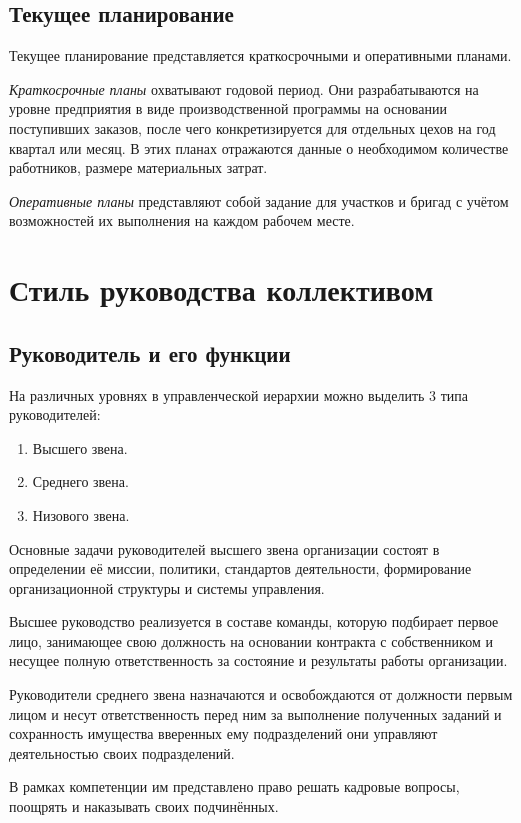 \documentclass[12pt, russian, oneside, article]{ncc}
\begin{document}
\subsection{Текущее планирование}
\label{sec-2_4}


Текущее планирование представляется краткосрочными и оперативными планами.

\emph{Краткосрочные планы} охватывают годовой период. Они разрабатываются на уровне предприятия в виде производственной программы на основании поступивших заказов, после чего конкретизируется для отдельных цехов на год квартал или месяц. В этих планах отражаются данные о необходимом количестве работников, размере материальных затрат.

\emph{Оперативные планы} представляют собой задание для участков и бригад с учётом возможностей их выполнения на каждом рабочем месте.
\section{Стиль руководства коллективом}
\label{sec-3}
\subsection{Руководитель и его функции}
\label{sec-3_1}


На различных уровнях в управленческой иерархии можно выделить 3 типа руководителей:
\begin{enumerate}
\item Высшего звена.
\item Среднего звена.
\item Низового звена.
\end{enumerate}

Основные задачи руководителей высшего звена организации состоят в определении её миссии, политики, стандартов деятельности, формирование организационной структуры и системы управления.

Высшее руководство реализуется в составе команды, которую подбирает первое лицо, занимающее свою должность на основании контракта с собственником и несущее полную ответственность за состояние и результаты работы организации.

Руководители среднего звена назначаются и освобождаются от должности первым лицом и несут ответственность перед ним за выполнение полученных заданий и сохранность имущества вверенных ему подразделений они управляют деятельностью своих подразделений.

В рамках компетенции им представлено право решать кадровые вопросы, поощрять и наказывать своих подчинённых.
\end{document}
